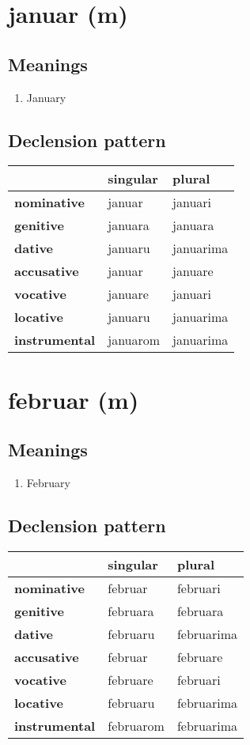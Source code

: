 \filbreak
\section{januar (m)}
\subsection*{Meanings}
\begin{enumerate}
\item January
\end{enumerate}
\subsection*{Declension pattern}
\begin{tabularx}{\linewidth}{Xll}
\toprule
{} &  singular &     plural \\
\midrule
\textbf{nominative  } &    januar &    januari \\
\textbf{genitive    } &   januara &    januara \\
\textbf{dative      } &   januaru &  januarima \\
\textbf{accusative  } &    januar &    januare \\
\textbf{vocative    } &   januare &    januari \\
\textbf{locative    } &   januaru &  januarima \\
\textbf{instrumental} &  januarom &  januarima \\
\bottomrule
\end{tabularx}

\filbreak
\section{februar (m)}
\subsection*{Meanings}
\begin{enumerate}
\item February
\end{enumerate}
\subsection*{Declension pattern}
\begin{tabularx}{\linewidth}{Xll}
\toprule
{} &   singular &      plural \\
\midrule
\textbf{nominative  } &    februar &    februari \\
\textbf{genitive    } &   februara &    februara \\
\textbf{dative      } &   februaru &  februarima \\
\textbf{accusative  } &    februar &    februare \\
\textbf{vocative    } &   februare &    februari \\
\textbf{locative    } &   februaru &  februarima \\
\textbf{instrumental} &  februarom &  februarima \\
\bottomrule
\end{tabularx}


